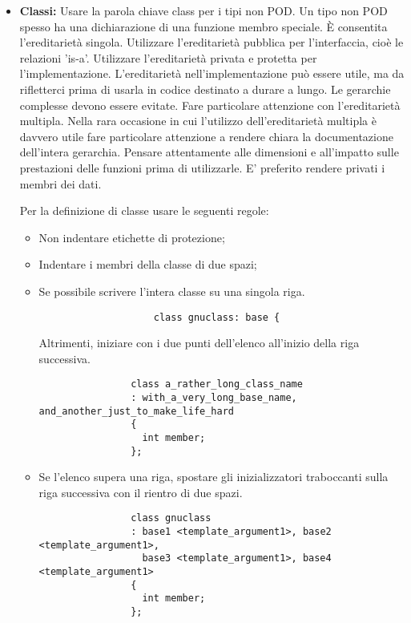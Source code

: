 \documentclass[../NomeDocumento.tex]{subfiles}
\begin{document}
\begin{itemize}
		\item \textbf{Classi:} Usare la parola chiave class per i tipi non POD.	
		Un tipo non POD spesso ha una dichiarazione di una funzione membro speciale.		
		È consentita l'ereditarietà singola. Utilizzare l'ereditarietà pubblica per l'interfaccia, cioè le relazioni 'is-a'. Utilizzare l'ereditarietà privata e protetta per l'implementazione. L'ereditarietà nell'implementazione può essere utile, ma da rifletterci prima di usarla in codice destinato a durare a lungo.		
		Le gerarchie complesse devono essere evitate. Fare particolare attenzione con l'ereditarietà multipla. Nella rara occasione in cui l'utilizzo dell'ereditarietà multipla è davvero utile fare particolare attenzione a rendere chiara la documentazione dell'intera gerarchia.		
		Pensare attentamente alle dimensioni e all'impatto sulle prestazioni delle funzioni prima di utilizzarle.		
		E' preferito rendere privati i membri dei dati.
		
		Per la definizione di classe usare le seguenti regole:
		
		\begin{itemize}
			\item Non indentare etichette di protezione;
			\item Indentare i membri della classe di due spazi;
			\item Se possibile scrivere l'intera classe su una singola riga.
				
				\begin{verbatim}
					class gnuclass: base {
				\end{verbatim}
					
				Altrimenti, iniziare con i due punti dell'elenco all'inizio della riga successiva.
				
				\begin{verbatim}
				class a_rather_long_class_name
				: with_a_very_long_base_name, and_another_just_to_make_life_hard
				{
				  int member;
				};
				\end{verbatim}
					
			\item Se l'elenco supera una riga, spostare gli inizializzatori traboccanti sulla riga successiva con il rientro di due spazi.
				
				\begin{verbatim}
				class gnuclass
				: base1 <template_argument1>, base2 <template_argument1>,
				  base3 <template_argument1>, base4 <template_argument1>
				{
				  int member;
				};
				\end{verbatim}
		\end{itemize}
		

\end{itemize}
\end{document}
